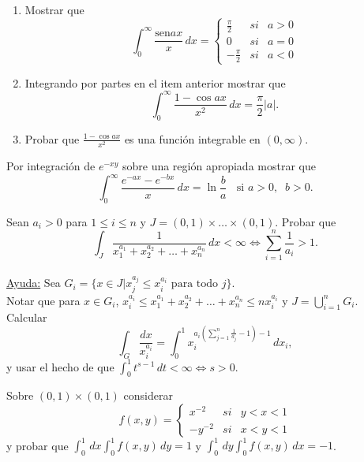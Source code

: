 \documentclass{book}
\begin{document}
\begin{ejer}{}
\begin{enumerate}
\item Mostrar que
\[
\int_0^{\infty} \frac{\text{sen} a x}{x}\,dx= 
\left
\{\begin{array}{rll}
\frac{\pi}{2}&si&a>0
\\
0&si&a=0
\\
-\frac{\pi}{2}&si&a<0
\end{array}
\right.
\] 
\item Integrando por partes en el item anterior mostrar que
\[
\int_0^{\infty}\frac{1-\cos ax}{x^2}\,dx=\frac{\pi}{2}|a|.
\]
\item Probar que $\frac{1-\cos ax}{x^2}$ es una función integrable en $(0,\infty)$.
\end{enumerate}
\end{ejer}


\begin{ejer}{}
 Por integración de $e^{-xy}$ sobre una región apropiada mostrar que 
\[
\int_0^{\infty}\frac{e^{-ax}-e^{-bx}}{x}\,dx=\ln\frac{b}{a}\;\; \mbox{  si   }a>0, \;\;b>0.
\]
\end{ejer}

\begin{ejer}{}
 Sean $a_i>0$ para $1\leq i \leq n$ y $J=(0,1)\times \ldots \times (0,1)$.
Probar que 
\[
\int_J  \frac{1}{x_1^{a_1}+x_2^{a_2}+\ldots+x_n^{a_n}}\,dx<\infty 
\Leftrightarrow
\sum\limits_{i=1}^{n}\frac{1}{a_i}>1.
\]
\\
\underline{Ayuda:}
Sea $G_i=\{x \in J | x_j^{a_j} \leq x_i^{a_i} \mbox{ para todo  } j \}$. \\
Notar que para $x \in G_i$, $x_i^{a_i}\leq x_1^{a_1}+x_2^{a_2}+\ldots+x_n^{a_n}\leq n x_i^{a_i}$
y $J=\bigcup\limits_{i=1}^{n} G_i$. \\
Calcular 
\[
\int_G \frac{dx}{x_i^{a_i}}=\int_0^1 x_i ^{a_i\left(\sum\limits_{j=1}^n \frac{1}{a_j}-1\right)-1}\,dx_i,
\]
y usar el hecho de que $\int_0^1 t^{s-1}\,dt<\infty \Leftrightarrow s>0$.
\end{ejer}


\begin{ejer}{}
Sobre $(0,1)\times (0,1)$ considerar
\[
f(x,y)=\left\{
\begin{array}{rll}
x^{-2}&si&y<x<1
\\
-y^{-2}&si&x<y<1
\end{array}
\right.
\]
y probar que $\int_0^1\,dx\int_0^1 f(x,y)\,dy=1$ y $\int_0^1\,dy \int_0^1 f(x,y)\,dx=-1$.
\end{ejer}
\end{document}
